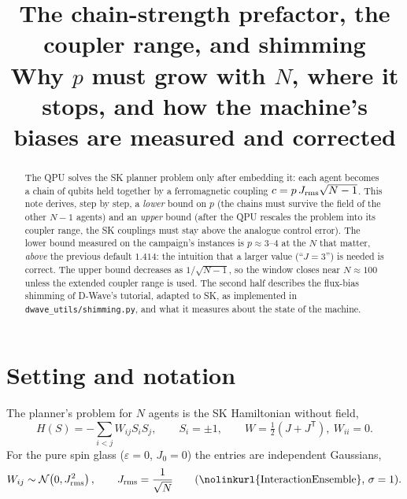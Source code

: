 \documentclass[11pt,a4paper]{article}
\title{The chain-strength prefactor, the coupler range, and shimming\\[4pt]
\large Why $p$ must grow with $N$, where it stops, and how the machine's biases are measured and corrected}
\author{\code{Projects_master_HPQC/scripts/QuantumComputing/Dimod}}
\date{}
\newcommand{\code}[1]{\nolinkurl{#1}}
\begin{document}
\maketitle
\begin{abstract}
The QPU solves the SK planner problem only after embedding it: each agent becomes a chain of qubits held together by a ferromagnetic coupling $c=p\,J_{\rm rms}\sqrt{N-1}$. This note derives, step by step, a \emph{lower} bound on $p$ (the chains must survive the field of the other $N-1$ agents) and an \emph{upper} bound (after the QPU rescales the problem into its coupler range, the SK couplings must stay above the analogue control error). The lower bound measured on the campaign's instances is $p\approx3$--$4$ at the $N$ that matter, \emph{above} the previous default $1.414$: the intuition that a larger value (``$J=3$'') is needed is correct. The upper bound decreases as $1/\sqrt{N-1}$, so the window closes near $N\approx100$ unless the extended coupler range is used. The second half describes the flux-bias shimming of D-Wave's tutorial, adapted to SK, as implemented in \code{dwave_utils/shimming.py}, and what it measures about the state of the machine.
\end{abstract}
\tableofcontents

\section{Setting and notation}
The planner's problem for $N$ agents is the SK Hamiltonian without field,
\begin{equation}
H(S)=-\sum_{i<j}W_{ij}S_iS_j,\qquad S_i=\pm1,\qquad W=\tfrac12(J+J^{\mathsf T}),\ W_{ii}=0 .
\end{equation}
For the pure spin glass ($\varepsilon=0$, $J_0=0$) the entries are independent Gaussians,
\begin{equation}
W_{ij}\sim\mathcal N\!\left(0,J_{\rm rms}^2\right),\qquad J_{\rm rms}=\frac{1}{\sqrt N}\qquad(\text{\code{InteractionEnsemble}, }\sigma=1).
\end{equation}
\end{document}

